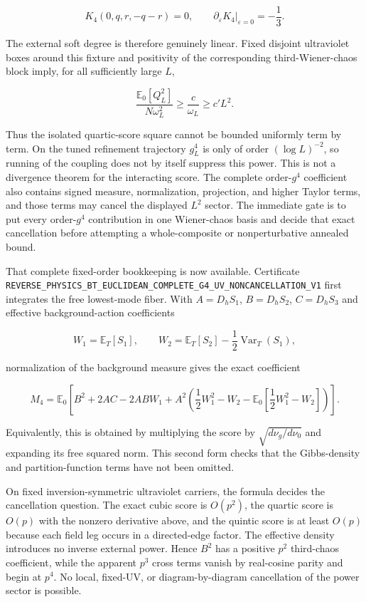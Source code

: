 \documentclass[11pt]{article}
\theoremstyle{definition}
\theoremstyle{remark}
\newcommand{\cert}[1]{\nolinkurl{#1}}
\begin{document}
\[
 K_4(0,q,r,-q-r)=0,
 \qquad
 \left.\partial_\varepsilon K_4\right|_{\varepsilon=0}=-\frac13.
\]

The external soft degree is therefore genuinely linear.  Fixed disjoint
ultraviolet boxes around this fixture and positivity of the corresponding
third-Wiener-chaos block imply, for all sufficiently large $L$,

\[
 \frac{\mathbb E_0[Q_L^2]}{N\omega_L^2}
 \geq\frac{c}{\omega_L}\geq c'L^2.
\]

Thus the isolated quartic-score square cannot be bounded uniformly term by
term.  On the tuned refinement trajectory $g_L^4$ is only of order
$(\log L)^{-2}$, so running of the coupling does not by itself suppress this
power.  This is not a divergence theorem for the interacting score.  The
complete order-$g^4$ coefficient also contains signed measure, normalization,
projection, and higher Taylor terms, and those terms may cancel the displayed
$L^2$ sector.  The immediate gate is to put every order-$g^4$ contribution in
one Wiener-chaos basis and decide that exact cancellation before attempting a
whole-composite or nonperturbative annealed bound.

That complete fixed-order bookkeeping is now available.  Certificate
\cert{REVERSE_PHYSICS_BT_EUCLIDEAN_COMPLETE_G4_UV_NONCANCELLATION_V1}
first integrates the free lowest-mode fiber.  With
$A=D_hS_1$, $B=D_hS_2$, $C=D_hS_3$ and effective background-action
coefficients

\[
 W_1=\mathbb E_T[S_1],\qquad
 W_2=\mathbb E_T[S_2]-\frac12\operatorname{Var}_T(S_1),
\]

normalization of the background measure gives the exact coefficient

\[
 M_4=\mathbb E_0\left[
 B^2+2AC-2ABW_1
 +A^2\left(\frac12W_1^2-W_2
 -\mathbb E_0\left[\frac12W_1^2-W_2\right]\right)
 \right].
\]

Equivalently, this is obtained by multiplying the score by
$\sqrt{d\nu_g/d\nu_0}$ and expanding its free squared norm.  This second
form checks that the Gibbs-density and partition-function terms have not been
omitted.

On fixed inversion-symmetric ultraviolet carriers, the formula decides the
cancellation question.  The exact cubic score is $O(p^2)$, the quartic score
is $O(p)$ with the nonzero derivative above, and the quintic score is at least
$O(p)$ because each field leg occurs in a directed-edge factor.  The effective
density introduces no inverse external power.  Hence $B^2$ has a positive
$p^2$ third-chaos coefficient, while the apparent $p^3$ cross terms vanish by
real-cosine parity and begin at $p^4$.  No local, fixed-UV, or
diagram-by-diagram cancellation of the power sector is possible.
\end{document}
